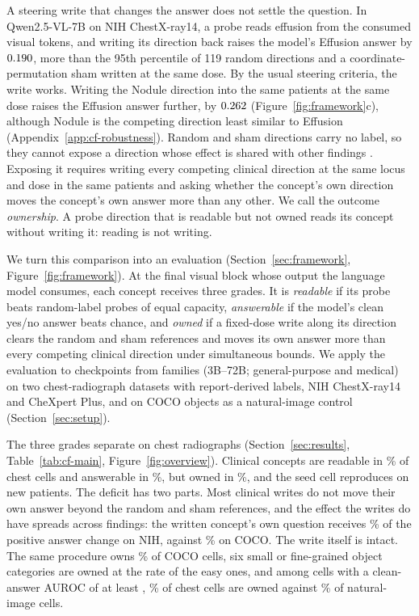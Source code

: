 \documentclass{article}
\begin{document}
A steering write that changes the answer does not settle the question. In Qwen2.5-VL-7B on NIH ChestX-ray14, a probe reads effusion from the consumed visual tokens, and writing its direction back raises the model's Effusion answer by $0.190$, more than the 95th percentile of 119 random directions and a coordinate-permutation sham written at the same dose. By the usual steering criteria, the write works. Writing the Nodule direction into the same patients at the same dose raises the Effusion answer further, by $0.262$ (Figure~\ref{fig:framework}c), although Nodule is the competing direction least similar to Effusion (Appendix~\ref{app:cf-robustness}). Random and sham directions carry no label, so they cannot expose a direction whose effect is shared with other findings \citep{pahde2025navigating}. Exposing it requires writing every competing clinical direction at the same locus and dose in the same patients and asking whether the concept's own direction moves the concept's own answer more than any other. We call the outcome \emph{ownership}. A probe direction that is readable but not owned reads its concept without writing it: reading is not writing.

We turn this comparison into an evaluation (Section~\ref{sec:framework}, Figure~\ref{fig:framework}). At the final visual block whose output the language model consumes, each concept receives three grades. It is \emph{readable} if its probe beats random-label probes of equal capacity, \emph{answerable} if the model's clean yes/no answer beats chance, and \emph{owned} if a fixed-dose write along its direction clears the random and sham references and moves its own answer more than every competing clinical direction under simultaneous bounds. We apply the evaluation to \cfCheckpoints{} checkpoints from \cfFamiliesWord{} families (3B--72B; general-purpose and medical) on two chest-radiograph datasets with report-derived labels, NIH ChestX-ray14 and CheXpert Plus, and on COCO objects as a natural-image control (Section~\ref{sec:setup}).

The three grades separate on chest radiographs (Section~\ref{sec:results}, Table~\ref{tab:cf-main}, Figure~\ref{fig:overview}). Clinical concepts are readable in \cfChestReadablePct\% of chest cells and answerable in \cfChestAnswerablePct\%, but owned in \cfChestOwnedPct\%, and the seed cell reproduces on new patients. The deficit has two parts. Most clinical writes do not move their own answer beyond the random and sham references, and the effect the writes do have spreads across findings: the written concept's own question receives \cfOwnShareNih\% of the positive answer change on NIH, against \cfOwnShareCoco\% on COCO. The write itself is intact. The same procedure owns \cfCocoOwnedPct\% of COCO cells, six small or fine-grained object categories are owned at the rate of the easy ones, and among cells with a clean-answer AUROC of at least \cfStratTopEdge{}, \cfStratChestTopPct\% of chest cells are owned against \cfStratNatTopPct\% of natural-image cells.
\end{document}

